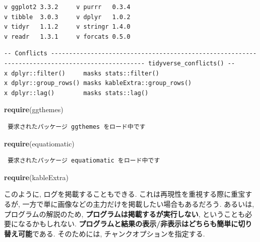 \documentclass[
  nomag]{bxjsbook}
\newenvironment{Shaded}{\begin{snugshade}}{\end{snugshade}}
\newcommand{\KeywordTok}[1]{\textcolor[rgb]{0.13,0.29,0.53}{\textbf{#1}}}
\newcommand{\NormalTok}[1]{#1}
\theoremstyle{definition}
\theoremstyle{definition}
\theoremstyle{definition}
\theoremstyle{remark}
\begin{document}
\begin{verbatim}
v ggplot2 3.3.2     v purrr   0.3.4
v tibble  3.0.3     v dplyr   1.0.2
v tidyr   1.1.2     v stringr 1.4.0
v readr   1.3.1     v forcats 0.5.0
\end{verbatim}

\begin{verbatim}
-- Conflicts ------------------------------------------------------------------------------------------------ tidyverse_conflicts() --
x dplyr::filter()     masks stats::filter()
x dplyr::group_rows() masks kableExtra::group_rows()
x dplyr::lag()        masks stats::lag()
\end{verbatim}

\begin{Shaded}
\begin{Highlighting}[numbers=left,,]
\KeywordTok{require}\NormalTok{(ggthemes)}
\end{Highlighting}
\end{Shaded}

\begin{verbatim}
 要求されたパッケージ ggthemes をロード中です 
\end{verbatim}

\begin{Shaded}
\begin{Highlighting}[numbers=left,,]
\KeywordTok{require}\NormalTok{(equatiomatic)}
\end{Highlighting}
\end{Shaded}

\begin{verbatim}
 要求されたパッケージ equatiomatic をロード中です 
\end{verbatim}

\begin{Shaded}
\begin{Highlighting}[numbers=left,,]
\KeywordTok{require}\NormalTok{(kableExtra)}
\end{Highlighting}
\end{Shaded}

このように, ログを掲載することもできる.
これは再現性を重視する際に重宝するが,
一方で単に画像などの主力だけを掲載したい場合もあるだろう. あるいは,
プログラムの解説のため, \textbf{プログラムは掲載するが実行しない},
ということも必要になるかもしれない.
\textbf{プログラムと結果の表示/非表示はどちらも簡単に切り替え可能}である.
そのためには, チャンクオプションを指定する.
\end{document}
